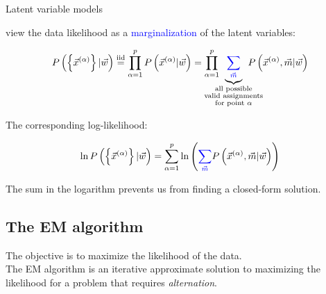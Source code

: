 \begin{frame}{Latent variable models}

 view the data likelihood as a \textcolor{blue}{marginalization} of the latent variables:

\svspace{-1mm}

\begin{equation}
P \left( \left\{ \vec{x}^{(\alpha)} \right\} | \vec{w} \right) \stackrel{\text{iid}}{=} \prod_{\alpha=1}^{p} P \left( \vec{x}^{(\alpha)} | \vec{w} \right) = \prod_{\alpha=1}^{p}  
\kern-4ex
\underbrace{{\color{blue}\sum_{\vec{m}}}}_{
\substack{\text{all possible}\\\text{valid assignments}\\{\text{for point }\alpha}}
} 
\kern-4ex
P \left( \vec{x}^{(\alpha)}, \vec{m} | \vec{w} \right)
\end{equation}

\svspace{-5mm}

The corresponding log-likelihood:

\begin{equation}
\ln P \left( \left\{ \vec{x}^{(\alpha)} \right\} | \vec{w} \right) = \sum_{\alpha=1}^{p}  \ln \left( {\color{blue}\sum_{\vec{m}}} P \left( \vec{x}^{(\alpha)}, \vec{m} | \vec{w} \right) \right)
\end{equation}

The sum in the logarithm prevents us from finding a closed-form solution.

\pause


\end{frame}

\subsection{The EM algorithm}

\begin{frame}{\subsecname}


The objective is to maximize the likelihood of the data.\\

The EM algorithm is an iterative approximate solution to maximizing the likelihood for a problem that requires \emph{alternation}.

\end{frame}

